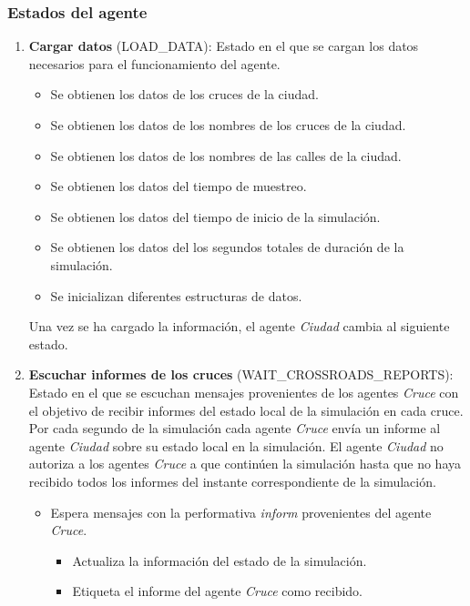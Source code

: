 \subsubsection{Estados del agente}
\begin{enumerate}
    \item \textbf{Cargar datos} \footnotesize(LOAD\_DATA)\normalsize: Estado en el que se cargan los datos necesarios para el funcionamiento del agente.
    \begin{itemize}
        \item Se obtienen los datos de los cruces de la ciudad.
        \item Se obtienen los datos de los nombres de los cruces de la ciudad.
        \item Se obtienen los datos de los nombres de las calles de la ciudad.
        \item Se obtienen los datos del tiempo de muestreo.
        \item Se obtienen los datos del tiempo de inicio de la simulación.
        \item Se obtienen los datos del los segundos totales de duración de la simulación.
        \item Se inicializan diferentes estructuras de datos.
    \end{itemize}
    Una vez se ha cargado la información, el agente \textit{Ciudad} cambia al siguiente estado.
    \item \textbf{Escuchar informes de los cruces} \footnotesize(WAIT\_CROSSROADS\_REPORTS)\normalsize: Estado en el que se escuchan mensajes provenientes de los agentes \textit{Cruce} con el objetivo de recibir informes del estado local de la simulación en cada cruce. Por cada segundo de la simulación cada agente \textit{Cruce} envía un informe al agente \textit{Ciudad} sobre su estado local en la simulación. El agente \textit{Ciudad} no autoriza a los agentes \textit{Cruce} a que continúen la simulación hasta que no haya recibido todos los informes del instante correspondiente de la simulación.
    \begin{itemize}
        \item Espera mensajes con la performativa \textit{inform} provenientes del agente \textit{Cruce}.
            \begin{itemize}
                \item Actualiza la información del estado de la simulación.
                \item Etiqueta el informe del agente \textit{Cruce} como recibido.

\end{itemize}
\end{itemize}
\end{enumerate}

